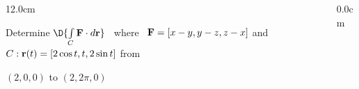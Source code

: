 \begin{frame}
\frametitle{}
\scriptsize
\begin{columns}
\begin{column}{12.0cm}

\EX	Determine $\D{ \int \limits_{C} {\bf F} \cdot d{\bf r}}$ \, where \, ${\bf F} = [x-y,y-z,z-x]$ and $C: {\bf r}(t) = [2\cos t, t, 2\sin t]$ from

\hspace{9.5cm} $(2,0,0)$ to $(2,2\pi,0)$

\vspace{0.2cm}

\SOL

\vspace{7.2cm}

\end{column}
\begin{column}{0.0cm}\end{column}
\end{columns}
\end{frame}

